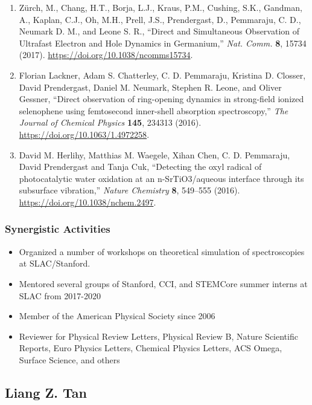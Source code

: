 \begin{enumerate}
    \item Zürch, M., Chang, H.T., Borja, L.J., Kraus, P.M., Cushing, S.K., Gandman, A., Kaplan, C.J., Oh, M.H., Prell, J.S., Prendergast, D., Pemmaraju, C. D., Neumark D. M., and Leone S. R., “Direct and Simultaneous Observation of Ultrafast Electron and Hole Dynamics in Germanium,” {\it Nat. Comm.} {\bf 8}, 15734 (2017). \url{https://doi.org/10.1038/ncomms15734}.
    \item Florian Lackner, Adam S. Chatterley, C. D. Pemmaraju, Kristina D. Closser, David Prendergast,  Daniel M. Neumark, Stephen R. Leone, and  Oliver Gessner, “Direct observation of ring-opening dynamics in strong-field ionized selenophene using femtosecond inner-shell absorption spectroscopy,” {\it The Journal of Chemical Physics} {\bf 145}, 234313 (2016). \url{ https://doi.org/10.1063/1.4972258}.
    \item David M. Herlihy, Matthias M. Waegele, Xihan Chen, C. D. Pemmaraju, David Prendergast and Tanja Cuk, “Detecting the oxyl radical of photocatalytic water oxidation at an n-SrTiO3/aqueous interface through its subsurface vibration,” {\it Nature Chemistry} {\bf 8}, 549–555 (2016). \url{https://doi.org/10.1038/nchem.2497}.
\end{enumerate}

\subsubsection*{Synergistic Activities}

\begin{itemize}
    \item Organized a number of workshops on theoretical simulation of spectroscopies at SLAC/Stanford.
    \item Mentored several groups of  Stanford, CCI, and STEMCore summer interns at SLAC from 2017-2020 
    \item Member of the American Physical Society since 2006
    \item Reviewer for Physical Review Letters, Physical Review B, Nature Scientific Reports, Euro Physics Letters, Chemical Physics Letters, ACS Omega, Surface Science, and others 

\end{itemize}

\clearpage

\subsection*{Liang Z. Tan}

